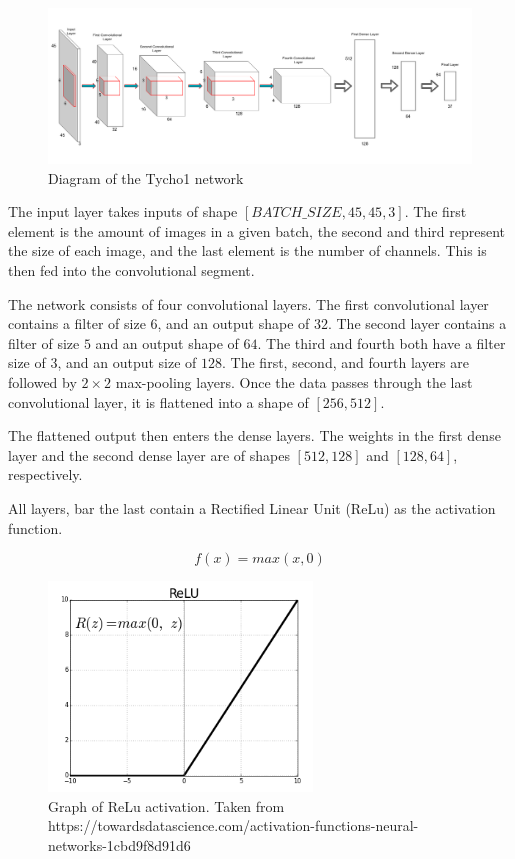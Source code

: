 \documentclass[12pt,a4paper,oneside,oldfontcommands]{memoir}
\begin{document}
\begin{Declaration Of OriginalityOrginality}
\begin{figure}[H]
  \centering
    \includegraphics[width=\linewidth]{images/Tycho1.png}
    \caption{Diagram of the Tycho1 network}
    \label{fig:tycho1}
\end{figure}


The input layer takes inputs of shape \([BATCH\_SIZE, 45, 45, 3]\). The first element is the amount of images in a given batch, the second and third represent the size of each image, and the last element is the number of channels. This is then fed into the convolutional segment.

The network consists of four convolutional layers. The first convolutional layer contains a filter of size \(6\), and an output shape of \(32\). The second layer contains a filter of size \(5\) and an output shape of \(64\). The third and fourth both have a filter size of \(3\), and an output size of \(128\). The first, second, and fourth layers are followed by \(2\times2\) max-pooling layers. Once the data passes through the last convolutional layer, it is flattened into a shape of \([256, 512]\).

The flattened output then enters the dense layers. The weights in the first dense layer and the second dense layer are of shapes \([512, 128]\) and \([128, 64]\), respectively. 

All layers, bar the last contain a Rectified Linear Unit (ReLu) as the activation function.

\begin{equation}
    f(x)=max(x, 0)
    \label{eq:relu}
\end{equation}

\begin{figure}[H]
  \centering
    \includegraphics[width=7cm]{images/relu.png}
    \caption{Graph of ReLu activation. Taken from https://towardsdatascience.com/activation-functions-neural-networks-1cbd9f8d91d6}
    \label{fig:relu_graph}
\end{figure}


\end{Declaration Of OriginalityOrginality}
\end{document}
